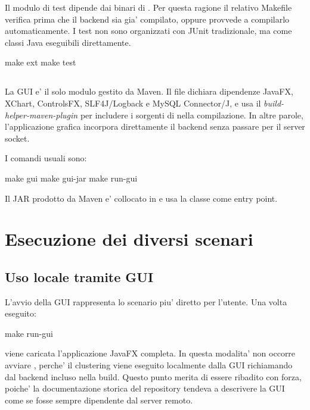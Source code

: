 Il modulo di test dipende dai binari di . Per questa ragione il relativo
Makefile verifica prima che il backend sia gia' compilato, oppure provvede a compilarlo
automaticamente. I test non sono organizzati con JUnit tradizionale, ma come classi Java
eseguibili direttamente.

\begin{commandblock}
  make ext
  make test
\end{commandblock}

\subsection{}

La GUI e' il solo modulo gestito da Maven. Il file  dichiara
dipendenze JavaFX, XChart, ControlsFX, SLF4J/Logback e MySQL Connector/J, e usa il
\emph{build-helper-maven-plugin} per includere i sorgenti di  nella
compilazione. In altre parole, l'applicazione grafica incorpora direttamente il backend
senza passare per il server socket.

I comandi usuali sono:

\begin{commandblock}
  make gui
  make gui-jar
  make run-gui
\end{commandblock}

Il JAR prodotto da Maven e' collocato in  e usa la
classe  come entry point.

\section{Esecuzione dei diversi scenari}

\subsection{Uso locale tramite GUI}

L'avvio della GUI rappresenta lo scenario piu' diretto per l'utente. Una volta eseguito:

\begin{commandblock}
  make run-gui
\end{commandblock}

viene caricata l'applicazione JavaFX completa. In questa modalita' non occorre avviare
, perche' il clustering viene eseguito localmente dalla GUI richiamando
 dal backend incluso nella build. Questo punto merita di essere ribadito
con forza, poiche' la documentazione storica del repository tendeva a descrivere la GUI
come se fosse sempre dipendente dal server remoto.

